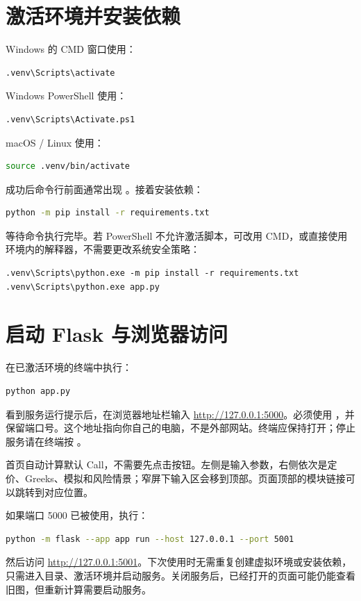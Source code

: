 \documentclass[UTF8,a4paper,12pt]{ctexart}
\begin{document}
\newpage

\section{激活环境并安装依赖}
Windows 的 CMD 窗口使用：
\begin{lstlisting}
.venv\Scripts\activate
\end{lstlisting}
Windows PowerShell 使用：
\begin{lstlisting}
.venv\Scripts\Activate.ps1
\end{lstlisting}
macOS / Linux 使用：
\begin{lstlisting}[language=bash]
source .venv/bin/activate
\end{lstlisting}
成功后命令行前面通常出现 。接着安装依赖：
\begin{lstlisting}[language=bash]
python -m pip install -r requirements.txt
\end{lstlisting}
等待命令执行完毕。若 PowerShell 不允许激活脚本，可改用 CMD，或直接使用环境内的解释器，不需要更改系统安全策略：
\begin{lstlisting}
.venv\Scripts\python.exe -m pip install -r requirements.txt
.venv\Scripts\python.exe app.py
\end{lstlisting}

\section{启动 Flask 与浏览器访问}
在已激活环境的终端中执行：
\begin{lstlisting}[language=bash]
python app.py
\end{lstlisting}
看到服务运行提示后，在浏览器地址栏输入 \url{http://127.0.0.1:5000}。必须使用 ，并保留端口号。这个地址指向你自己的电脑，不是外部网站。终端应保持打开；停止服务请在终端按 。

首页自动计算默认 Call，不需要先点击按钮。左侧是输入参数，右侧依次是定价、Greeks、模拟和风险情景；窄屏下输入区会移到顶部。页面顶部的模块链接可以跳转到对应位置。

如果端口 5000 已被使用，执行：
\begin{lstlisting}[language=bash]
python -m flask --app app run --host 127.0.0.1 --port 5001
\end{lstlisting}
然后访问 \url{http://127.0.0.1:5001}。下次使用时无需重复创建虚拟环境或安装依赖，只需进入目录、激活环境并启动服务。关闭服务后，已经打开的页面可能仍能查看旧图，但重新计算需要启动服务。
\newpage
\end{document}
